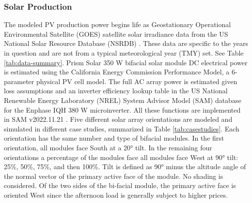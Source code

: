 \documentclass[journal,article,submit,pdftex,moreauthors]{Definitions/mdpi}
\begin{document}
\subsubsection{Solar Production}\label{solar-production}%

The modeled PV production power begins life as Geostationary Operational Environmental Satellite (GOES) satellite solar irradiance data from the US National Solar Resource Database (NSRDB) \cite{Sengupta2018}. These data are specific to the years in question and are not from a typical meteorological year (TMY) set. See Table \ref{tab:data-summary}. Prism Solar 350 W bifacial solar module DC electrical power is estimated using the California Energy Commission Performance Model, a 6-parameter physical PV cell model. The full AC array power is estimated given loss assumptions and an inverter efficiency lookup table in the US National Renewable Energy Laboratory (NREL) System Advisor Model (SAM) database \cite{NREL2022} for the Enphase IQH 380 W microinverter. All these functions are implemented in SAM v2022.11.21 \cite{NREL2022}. Five different solar array orientations are modeled and simulated in different case studies, summarized in Table \ref{tab:casestudies}. Each orientation has the same number and type of bifacial modules. In the first orientation, all modules face South at a 20° tilt. In the remaining four orientations a percentage of the modules face all modules face West at 90° tilt: 25\%, 50\%, 75\%, and then 100\%. Tilt is defined as 90° minus the altitude angle of the normal vector of the primary active face of the module. No shading is considered. Of the two sides of the bi-facial module, the primary active face is oriented West since the afternoon load is generally subject to higher prices.
\end{document}
